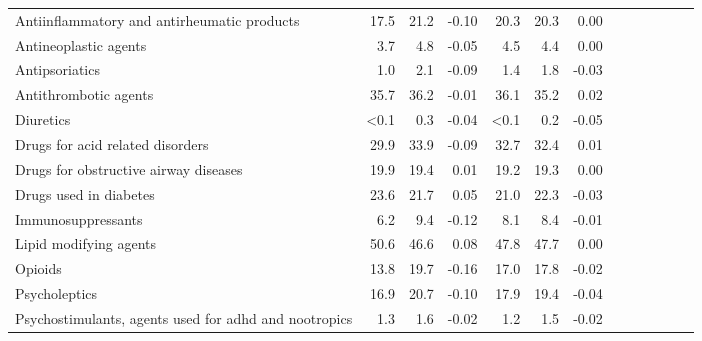 \documentclass[11pt,]{article}
\begin{document}
\begin{longtable}{lrrrrrrrrrrrr}
      Antiinflammatory and antirheumatic products & 17.5 & 21.2 & -0.10 & 20.3 & 20.3 &  0.00 \\ 
      Antineoplastic agents &  3.7 &  4.8 & -0.05 &  4.5 &  4.4 &  0.00 \\ 
      Antipsoriatics &  1.0 &  2.1 & -0.09 &  1.4 &  1.8 & -0.03 \\ 
      Antithrombotic agents & 35.7 & 36.2 & -0.01 & 36.1 & 35.2 &  0.02 \\ 
      Diuretics & <0.1 &  0.3 & -0.04 & <0.1 &  0.2 & -0.05 \\ 
      Drugs for acid related disorders & 29.9 & 33.9 & -0.09 & 32.7 & 32.4 &  0.01 \\ 
      Drugs for obstructive airway diseases & 19.9 & 19.4 &  0.01 & 19.2 & 19.3 &  0.00 \\ 
      Drugs used in diabetes & 23.6 & 21.7 &  0.05 & 21.0 & 22.3 & -0.03 \\ 
      Immunosuppressants &  6.2 &  9.4 & -0.12 &  8.1 &  8.4 & -0.01 \\ 
      Lipid modifying agents & 50.6 & 46.6 &  0.08 & 47.8 & 47.7 &  0.00 \\ 
      Opioids & 13.8 & 19.7 & -0.16 & 17.0 & 17.8 & -0.02 \\ 
      Psycholeptics & 16.9 & 20.7 & -0.10 & 17.9 & 19.4 & -0.04 \\ 
      Psychostimulants, agents used for adhd and nootropics &  1.3 &  1.6 & -0.02 &  1.2 &  1.5 & -0.02 \\ 
   \bottomrule\end{longtable}
\clearpage
{}
\end{document}
